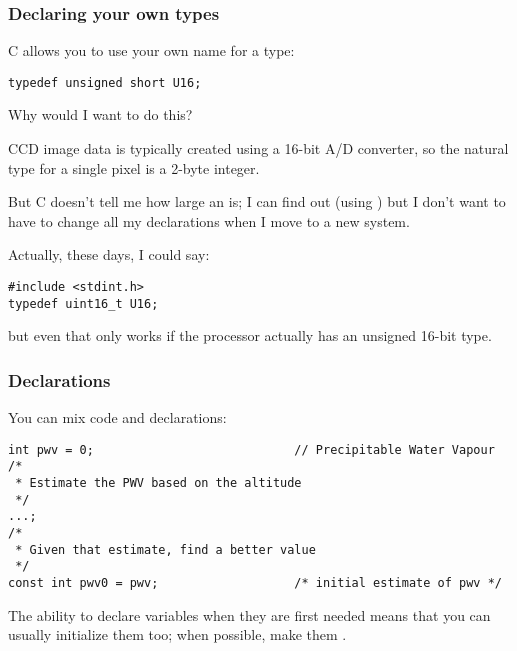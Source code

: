 \documentclass[10pt, t]{beamer}
\begin{document}
\begin{frame}[fragile]
\frametitle{Declaring your own types}
\label{sec-1_1_3}

C allows you to use your own name for a type:
\begin{verbatim}
typedef unsigned short U16;
\end{verbatim}
\pause
Why would I want to do this?

\pause
CCD image data is typically created using a 16-bit A/D converter, so
the natural type for a single pixel is a 2-byte integer.

But C doesn't tell me how large an  is; I 
can find out (using ) but I don't want to have to change all my declarations when I move
to a new system.

\pause
Actually, these days, I could say:
\begin{verbatim}
#include <stdint.h>
typedef uint16_t U16;
\end{verbatim}
but even that only works if the processor actually has an unsigned 16-bit type.
\end{frame}
\begin{frame}[fragile]
\frametitle{Declarations}
\label{sec-1_1_4}

You can mix code and declarations:
\begin{verbatim}
int pwv = 0;                            // Precipitable Water Vapour
/*
 * Estimate the PWV based on the altitude
 */
...;
/*
 * Given that estimate, find a better value
 */
const int pwv0 = pwv;                   /* initial estimate of pwv */
\end{verbatim}
\pause
The ability to declare variables when they are first needed means that you can usually initialize them too;
when possible, make them .
\end{frame}
\end{document}
